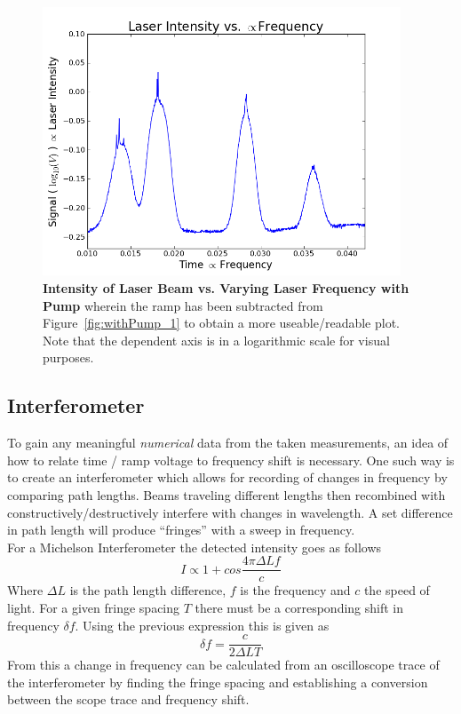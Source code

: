 \documentclass[paper=a4, fontsize=11pt]{scrartcl} %
\numberwithin{equation}{section}
\numberwithin{figure}{section}
\numberwithin{table}{section}
\begin{document}
\begin{figure}[H] \begin{center}
  \includegraphics[height=80mm]{3-1-002.png}
  \caption{\textbf{Intensity of Laser Beam vs. Varying Laser Frequency with Pump} wherein the ramp has been subtracted from Figure~\ref{fig:withPump_1} to obtain a more useable/readable plot. Note that the dependent axis is in a logarithmic scale for visual purposes. }
  \label{fig:withPump_2}
\end{center} \end{figure}

\subsection{Interferometer}
To gain any meaningful \emph{numerical} data from the taken measurements, an idea of how to relate time / ramp voltage to frequency shift is necessary. One such way is to create an interferometer which allows for recording of changes in frequency by comparing path lengths. Beams traveling different lengths then recombined with constructively/destructively interfere with changes in wavelength. A set difference in path length will produce ``fringes'' with a sweep in frequency. \\

For a Michelson Interferometer the detected intensity goes as follows
\begin{equation}
I \propto 1 + cos\frac{4\pi \Delta Lf}{c}
\end{equation}
Where $\Delta L$ is the path length difference, $f$ is the frequency
and $c$ the speed of light. For a given fringe spacing $T$ there must
be a corresponding shift in frequency $\delta f$. Using the previous
expression this is given as
\begin{equation}
\delta f = \frac{c}{2\Delta L T}
\end{equation}
From this a change in frequency can be calculated from an oscilloscope
trace of the interferometer by finding the fringe spacing and
establishing a conversion between the scope trace and frequency
shift. 
\end{document}
